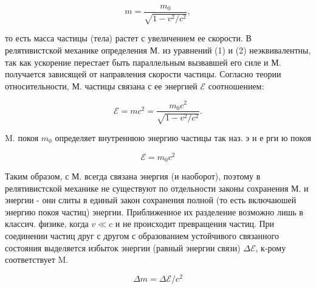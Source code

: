 \documentclass[10pt]{article}
\begin{document}
\[

m=\frac{m_{0}}{\sqrt{1-v^{2} / c^{2}}},

\]



то есть масса частицы (тела) растет с увеличением ее скорости. В релятивистской механике определения М. из уравнений (1) и (2) неэквивалентны, так как ускорение перестает быть параллельным вызвавшей его силе и М. получается зависящей от направления скорости частицы. Согласно теории относительности, М. частицы связана с ее энергией $\mathscr{E}$ соотношением:



\[

\mathscr{E}=m c^{2}=\frac{m_{0} c^{2}}{\sqrt{1-v^{2} / c^{2}}} .

\]



M. покоя $m_{0}$ определяет внутреннюю энергию частицы так наз. э н е рги ю покоя



\[

\mathscr{E}=m_{0} c^{2}

\]



Таким образом, с М. всегда связана энергия (и наоборот), поэтому в релятивистской механике не существуют по отдельности законы сохранения М. и энергии - они слиты в единый закон сохранения полной (то есть включаюшей энергию покоя частиц) энергии. Приближенное их разделение возможно лишь в классич. физике, когда $v \ll c$ и не происходит превращения частиц. При соединении частиц друг с другом с образованием устойчивого связанного состояния выделяется избыток энергии (равный энергии связи) $\Delta \mathscr{E}$, к-рому соответствует $\mathrm{M}$.



\[

\Delta m=\Delta \mathscr{E} / c^{2}

\]
\end{document}
